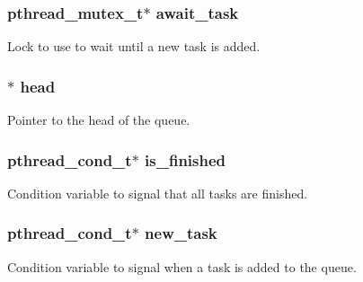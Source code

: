 \subsubsection[{await\+\_\+task}]{\setlength{\rightskip}{0pt plus 5cm}pthread\+\_\+mutex\+\_\+t$\ast$ await\+\_\+task}\label{struct_task___queue_a9e5223ee99a4ba19be87c90bfd48663e}


Lock to use to wait until a new task is added. 

\hypertarget{struct_task___queue_af5acea37bcf6ce1d8fcd3e164a93b37d}{}
\subsubsection[{head}]{$\ast$ head}\label{struct_task___queue_af5acea37bcf6ce1d8fcd3e164a93b37d}


Pointer to the head of the queue. 

\hypertarget{struct_task___queue_a5516e2d0cf00a5eeb4fb0ed563302577}{}
\subsubsection[{is\+\_\+finished}]{\setlength{\rightskip}{0pt plus 5cm}pthread\+\_\+cond\+\_\+t$\ast$ is\+\_\+finished}\label{struct_task___queue_a5516e2d0cf00a5eeb4fb0ed563302577}


Condition variable to signal that all tasks are finished. 

\hypertarget{struct_task___queue_a246f0c6d74730bab84d4cf40d95b4bcd}{}
\subsubsection[{new\+\_\+task}]{\setlength{\rightskip}{0pt plus 5cm}pthread\+\_\+cond\+\_\+t$\ast$ new\+\_\+task}\label{struct_task___queue_a246f0c6d74730bab84d4cf40d95b4bcd}


Condition variable to signal when a task is added to the queue. 

\hypertarget{struct_task___queue_a82c4f8c176f73a4611cfd93d8182047e}{}
